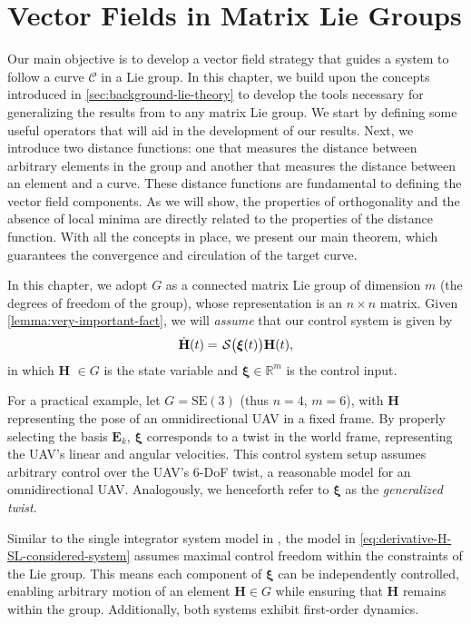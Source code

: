 \chapter{Vector Fields in Matrix Lie Groups}\label{ch:vector_field}
Our main objective is to develop a vector field strategy that guides a system to follow a curve $\mathcal{C}$ in a Lie group. In this chapter, we build upon the concepts introduced in \cref{sec:background-lie-theory} to develop the tools necessary for generalizing the results from \citet{Rezende2022} to any  matrix Lie group. We start by defining some useful operators that will aid in the development of our results. Next, we introduce two distance functions: one that measures the distance between arbitrary elements in the group and another that measures the distance between an element and a curve. These distance functions are fundamental to defining the vector field components. As we will show, the properties of orthogonality and the absence of local minima are directly related to the properties of the distance function. With all the concepts in place, we present our main theorem, which guarantees the convergence and circulation of the target curve.

In this chapter, we adopt $G$ as a connected matrix Lie group of dimension $m$ (the degrees of freedom of the group), whose representation is an $n\times n$ matrix. Given \cref{lemma:very-important-fact}, we will \emph{assume} that our control system is given by
\begin{align}
    \dot{\mathbf{H}}(t)=\SL\bigl(\boldsymbol{\xi}(t)\bigr)\mathbf{H}(t),
    \label{eq:derivative-H-SL-considered-system}
\end{align}
in which $\mathbf{H}$ $\in G$ is the state variable and $\boldsymbol{\xi} \in \mathbb{R}^m$ is the control input. 

For a practical example, let $G=\text{SE}(3)$ (thus $n=4$, $m=6$), with $\mathbf{H}$ representing the pose of an omnidirectional UAV in a fixed frame. By properly selecting the basis $\mathbf{E}_k$, $\boldsymbol{\xi}$ corresponds to a twist in the world frame, representing the UAV's linear and angular velocities. This control system setup assumes arbitrary control over the UAV's 6-DoF twist, a reasonable model for an omnidirectional UAV. Analogously, we henceforth refer to $\boldsymbol{\xi}$ as the \emph{generalized twist}. 

Similar to the single integrator system model in \citet{Rezende2022}, the model in \eqref{eq:derivative-H-SL-considered-system} assumes maximal control freedom within the constraints of the Lie group. This means each component of $\boldsymbol{\xi}$ can be independently controlled, enabling arbitrary motion of an element $\mathbf{H}\in G$ while ensuring that $\mathbf{H}$ remains within the group. Additionally, both systems exhibit first-order dynamics.

